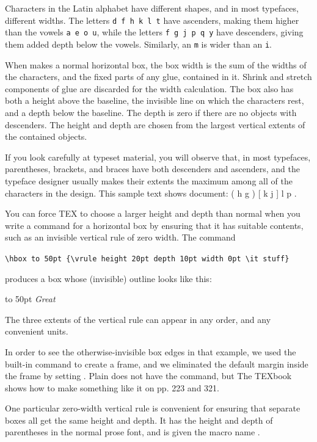 {Characters in the Latin alphabet have different shapes, and in most typefaces,
different widths. The letters \texttt{d f h k l t} have ascenders, making them
higher than the vowels \texttt{a e o u}, while the letters \texttt{f g j p q y} have descenders,
giving them added depth below the vowels. Similarly, an \texttt{m} is wider than
an \texttt{i}. 


When \tex makes a normal horizontal box, the box width is the sum
of the widths of the characters, and the fixed parts of any glue, contained
in it. Shrink and stretch components of glue are discarded for the width
calculation. The box also has both a height above the baseline, the invisible
line on which the characters rest, and a depth below the baseline. The
depth is zero if there are no objects with descenders. The height and depth
are chosen from the largest vertical extents of the contained objects.

If you look carefully at typeset material, you will observe that, in most
typefaces, parentheses, brackets, and braces have both descenders and ascenders,
and the typeface designer usually makes their extents the maximum
among all of the characters in the design. This sample text shows
document: ( h g ) [ k j ] { l p }.

You can force TEX to choose a larger height and depth than normal when
you write a command for a horizontal box by ensuring that it has suitable
contents, such as an invisible vertical rule of zero width. The command

\verb+\hbox to 50pt {\vrule height 20pt depth 10pt width 0pt \it stuff}+

produces a box whose (invisible) outline looks like this: 

\hbox to 50pt {\vrule height 20pt depth 10pt width 0pt \it Great}


The
three extents of the vertical rule can appear in any order, and any convenient
units.

In order to see the otherwise-invisible box edges in that example, we
used the \latex  built-in command  to create a frame, and we eliminated
the default margin inside the frame by setting . Plain \tex
does not have the  command, but The TEXbook shows how to make
something like it on pp. 223 and 321.

One particular zero-width vertical rule is convenient for ensuring that
separate boxes all get the same height and depth. It has the height and
depth of parentheses in the normal prose font, and is given the macro name .

}
